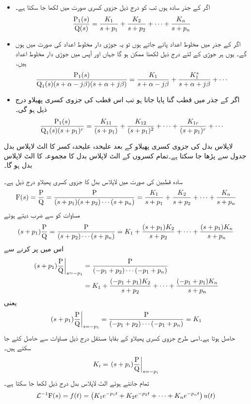 \begin{itemize}
\item
اگر  کے جذر سادہ ہوں تب  کو درج ذیل جزوی کسری صورت میں لکھا جا سکتا ہے۔
\begin{align}
\frac{{{\textup{P}}}_1(s)}{{{\textup{Q}}}(s)}=\frac{K_1}{s+p_1}+\frac{K_2}{s+p_2}+\cdots+\frac{K_n}{s+p_n}
\end{align}
\item
اگر  کے جذر میں مخلوط اعداد پائے جاتے ہوں تو یہ جوڑی دار مخلوط اعداد کی صورت میں ہوں گے۔ یوں ہر جوڑی کے لئے درج ذیل لکھنا ممکن ہو گا جہاں  اور  آپس میں جوڑی دار مخلوط اعداد ہیں۔
\begin{align}
\frac{{{\textup{P}}}_1(s)}{{{\textup{Q}}}_1(s) (s+\alpha-j\beta)(s+\alpha+j\beta)}=\frac{K_1}{s+\alpha-j\beta}+\frac{K^*_1}{s+\alpha+j\beta}+\cdots
\end{align}
\item
اگر  کے جذر میں قطب  گنا پایا جاتا ہو تب اس قطب کی جزوی کسری پھیلاو درج ذیل ہو گی۔
  \begin{align}
\frac{{{\textup{P}}}_1(s)}{{{\textup{Q}}}_1(s) (s+p_1)^r}=\frac{K_{11}}{(s+p_1)}+\frac{K_{12}}{(s+p_1)^2}+\cdots +\frac{K_{1r}}{(s+p_1)^r}+\cdots
\end{align}
\end{itemize}

لاپلاس بدل  کی جزوی کسری پھیلاو کے بعد علیحدہ علیحدہ کسر کا الٹ لاپلاس بدل جدول سے پڑھا جا سکتا ہے۔تمام کسروں کے الٹ لاپلاس بدل کا مجموعہ  کا الٹ لاپلاس بدل ہو گا۔

سادہ قطبین کی صورت میں لاپلاس بدل  کا جزوی کسری پھیلاو درج ذیل ہے۔
\begin{align*}
{\ensuremath{{\textup{F}}}}(s)=\frac{{{\textup{P}}}}{{{\textup{Q}}}}=\frac{{{\textup{P}}}}{(s+p_1)(s+p_2)\cdots(s+p_n)}=\frac{K_1}{s+p_1}+\frac{K_2}{s+p_2}+\cdots +\frac{K_n}{s+p_n}
\end{align*}
مساوات کو  سے ضرب دیتے ہوئے
\begin{align*}
(s+p_1)\frac{{{\textup{P}}}}{{{\textup{Q}}}}=\frac{{{\textup{P}}}}{(s+p_2)\cdots(s+p_n)}=K_1+\frac{(s+p_1)K_2}{s+p_2}+\cdots +\frac{(s+p_1)K_n}{s+p_n}
\end{align*}
اس میں  پر کرنے سے
\begin{align*}
\left. (s+p_1)\frac{{{\textup{P}}}}{{{\textup{Q}}}}\right|_{s=-p_1}&=\frac{{{\textup{P}}}}{(-p_1+p_2)\cdots(-p_1+p_n)}\\
&=K_1+\frac{(-p_1+p_1)K_2}{s+p_2}+\cdots +\frac{(-p_1+p_1)K_n}{s+p_n}
\end{align*}
یعنی
\begin{align*}
\left. (s+p_1)\frac{{{\textup{P}}}}{{{\textup{Q}}}}\right|_{s=-p_1}=\frac{{{\textup{P}}}}{(-p_1+p_2)\cdots(-p_1+p_n)}=K_1
\end{align*}
حاصل ہوتا ہے۔اسی طرح جزوی کسری پھیلاو کے بقایا مستقل درج ذیل مساوات سے حاصل کئے جا سکتے ہیں۔
\begin{align}
K_i=\left. (s+p_i)\frac{{{\textup{P}}}}{{{\textup{Q}}}}\right|_{s=-p_i}
\end{align}
تمام  جانتے ہوئے الٹ لاپلاس بدل درج ذیل لکھا جا سکتا ہے۔
\begin{align}
\mathcal{L}^{-1} {{\textup{F}}}(s)=f(t)=\left(K_1 e^{-p_1 t}+K_2 e^{-p_2 t}+\cdots+K_n e^{-p_n t}\right) u(t)
\end{align}

